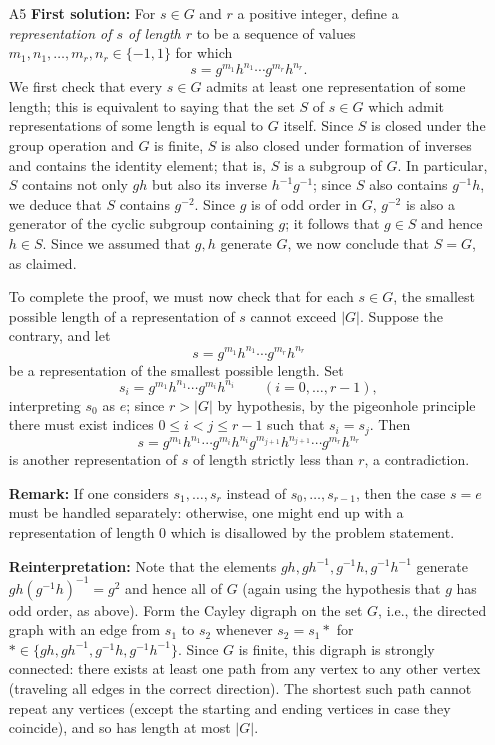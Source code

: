 \documentclass[amssymb,twocolumn,pra,10pt,aps]{revtex4-1}
\begin{document}
\begin{itemize}
\item[A5]
\noindent
\textbf{First solution:}
For $s \in G$ and $r$ a positive integer, define a \emph{representation of $s$ of length $r$}
to be a sequence of values $m_1, n_1, \ldots, m_r, n_r \in \{-1, 1\}$ for which
\[
s = g^{m_1} h^{n_1} \cdots g^{m_r} h^{n_r}.
\]
We first check that every $s \in G$ admits at least one representation of some length; this is equivalent to saying that the set $S$ of $s \in G$ which admit representations of some length
is equal to $G$ itself. 
Since $S$ is closed under the group operation and $G$ is finite, $S$ is also closed under formation of inverses and contains the identity element; that is, $S$ is a subgroup of $G$.
In particular, $S$ contains not only $gh$ but also its inverse $h^{-1} g^{-1}$; since $S$ also contains $g^{-1} h$, we deduce that $S$ contains $g^{-2}$. 
Since $g$ is of odd order in $G$, $g^{-2}$ is also a generator of the cyclic subgroup containing $g$; it follows that $g \in S$ and hence $h \in S$. Since we assumed that $g,h$ generate $G$,
we now conclude that $S = G$, as claimed.

To complete the proof, we must now check that for each $s \in G$, the smallest possible length of a representation of $s$ cannot exceed $|G|$. Suppose the contrary, and let
\[
s = g^{m_1} h^{n_1} \cdots g^{m_r} h^{n_r}
\]
be a representation of the smallest possible length. Set
\[
s_i = g^{m_1} h^{n_1} \cdots g^{m_i} h^{n_i} \qquad (i=0,\dots,r-1),
\]
interpreting $s_0$ as $e$; since $r>|G|$ by hypothesis, by the pigeonhole principle there must exist indices $0 \leq i < j \leq r-1$ such that $s_i = s_j$. Then
\[
s = g^{m_1} h^{n_1} \cdots g^{m_i} h^{n_i} g^{m_{j+1}} h^{n_{j+1}} \cdots g^{m_r} h^{n_r} 
\]
is another representation of $s$ of length strictly less than $r$, a contradiction.

\noindent
\textbf{Remark:}
If one considers $s_1,\dots,s_r$ instead of $s_0,\dots,s_{r-1}$, then the case $s=e$ must be handled separately: otherwise, one might end up with a representation of length 0 which is disallowed by the problem statement.

\noindent
\textbf{Reinterpretation:} 
Note that the elements $gh, gh^{-1}, g^{-1} h, g^{-1} h^{-1}$ generate $gh(g^{-1}h)^{-1} = g^2$ and hence all of $G$ (again using the hypothesis that $g$ has odd order, as above). Form the Cayley digraph on the set $G$, i.e., the directed graph with an edge from $s_1$ to $s_2$ whenever $s_2 = s_1 *$ for $* \in \{gh, gh^{-1}, g^{-1} h, g^{-1} h^{-1}\}$. Since $G$ is finite, this digraph is strongly connected: there exists at least one path from any vertex to any other vertex (traveling all edges in the correct direction). The shortest such path cannot repeat any vertices (except the starting and ending vertices in case they coincide), and so has length at most $|G|$.


\end{itemize}
\end{document}
